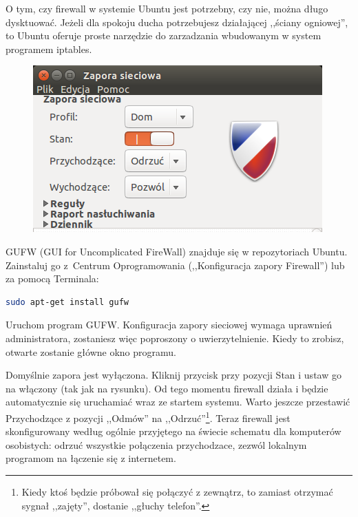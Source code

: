 O tym, czy firewall w systemie Ubuntu jest potrzebny, czy nie, można długo dysktuować. Jeżeli dla spokoju ducha potrzebujesz działającej ,,ściany ogniowej'', to Ubuntu oferuje proste narzędzie do zarzadzania wbudowanym w system programem iptables.

\begin{figure}
	\vspace{-10pt}
	\includegraphics[width=\linewidth]{images/programy_gufw.png}
\end{figure}

GUFW (\textcolor{ubuntu_orange}{GUI for Uncomplicated FireWall}) znajduje się w repozytoriach Ubuntu. Zainstaluj go z~Centrum Oprogramowania (,,Konfiguracja zapory Firewall'') lub za pomocą Terminala:
\begin{lstlisting}[language=bash]
sudo apt-get install gufw
\end{lstlisting}

Uruchom program GUFW. Konfiguracja zapory sieciowej wymaga uprawnień administratora, zostaniesz więc poproszony o uwierzytelnienie. Kiedy to zrobisz, otwarte zostanie główne okno programu.

Domyślnie zapora jest wyłączona. Kliknij przycisk przy pozycji \textcolor{ubuntu_orange}{Stan} i ustaw go na włączony (tak jak na rysunku). Od tego momentu firewall działa i będzie automatycznie się uruchamiać wraz ze startem systemu. Warto jeszcze przestawić \textcolor{ubuntu_orange}{Przychodzące} z pozycji ,,Odmów'' na ,,Odrzuć''\footnote{Kiedy ktoś będzie próbował się połączyć z zewnątrz, to zamiast otrzymać sygnał ,,zajęty'', dostanie ,,głuchy telefon''.}. Teraz firewall jest skonfigurowany według ogólnie przyjętego na świecie schematu dla komputerów osobistych: odrzuć wszystkie połączenia przychodzace, zezwól lokalnym programom na łączenie się z internetem.

